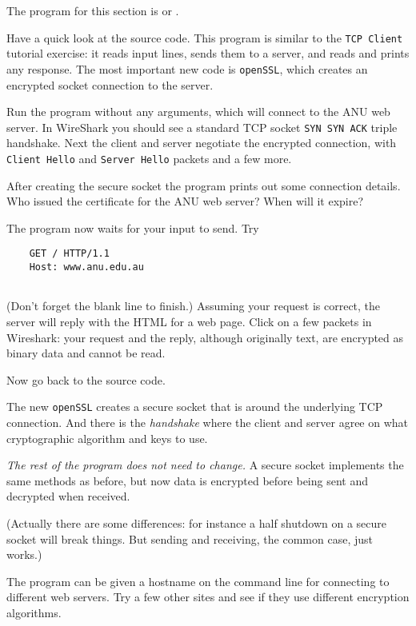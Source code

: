 \STEP The program for this section is  or .

Have a quick look at the source code. This program is similar to the
\texttt{TCP Client}
tutorial exercise: it reads input lines, sends them to a server, and reads and
prints any response. The most important new code is \texttt{openSSL}, which
creates an encrypted socket connection to the server.

Run the program without any arguments, which will connect to the ANU web server.
In WireShark you should see a standard TCP socket
\texttt{SYN SYN ACK} triple handshake.
Next the client and server negotiate the encrypted connection, with
\texttt{Client Hello} and \texttt{Server Hello} packets and a few more.

After creating the secure socket the program prints out some connection details.
Who issued the certificate for the ANU web server? When will it expire?

The program now waits for your input to send. Try
\begin{CODE}\begin{verbatim}
    GET / HTTP/1.1
    Host: www.anu.edu.au
    
\end{verbatim}\end{CODE}

(Don't forget the blank line to finish.)
Assuming your request is correct, the server will reply with the HTML for a web
page. Click on a few packets in Wireshark: your request and the reply, although
originally text, are encrypted as binary data and cannot be read.

Now go back to the source code.

The new \texttt{openSSL} creates a secure socket that is  around the
underlying TCP connection. And there is the \emph{handshake} where the client and
server agree on what cryptographic algorithm and keys to use.

\emph{The rest of the program does not need to change.} A secure socket implements
the same methods as before, but now data is encrypted before being sent and
decrypted when received.

(Actually there are some differences: for instance a half shutdown on a secure
socket will break things. But sending and receiving, the common case, just works.)

The program can be given a hostname on the command line for connecting to
different web servers. Try a few other sites and see if they use different
encryption algorithms.

